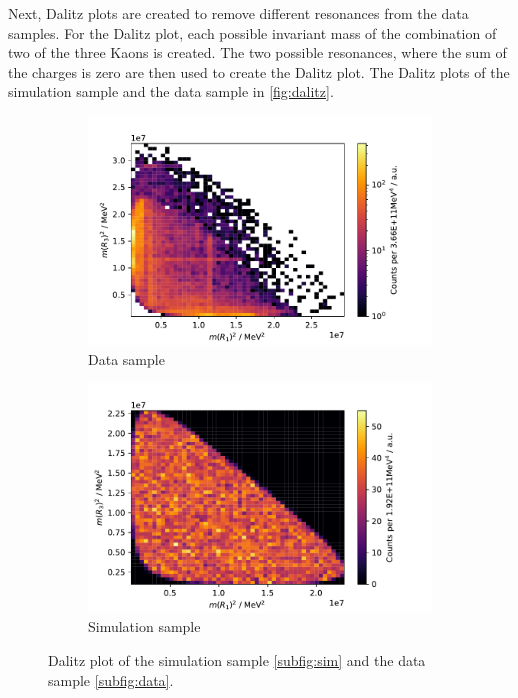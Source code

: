 Next, Dalitz plots are created to remove different resonances from the data samples. For the Dalitz plot, each possible invariant mass 
of the combination of two of the three Kaons is created. The two possible resonances, 
where the sum of the charges is zero are then used to create the Dalitz plot. 
The Dalitz plots of the simulation sample and the data sample in \autoref{fig:dalitz}.


\begin{figure}[H]
	\centering
	\begin{subfigure}{0.45\textwidth}
		\includegraphics[width=\textwidth]{content/pictures/image_fin/DalitzDataHist.pdf}
		\caption{Data sample}
		\label{subfig:data}
	\end{subfigure}
	\begin{subfigure}{0.45\textwidth}
		\includegraphics[width=\textwidth]{content/pictures/image_fin/DalitzSimHist.pdf}
		\caption{Simulation sample}
		\label{subfig:sim}
	\end{subfigure} 
	\caption{Dalitz plot of the simulation sample \eqref{subfig:sim} and the data sample \eqref{subfig:data}.}
	\label{fig:dalitz}
\end{figure}

